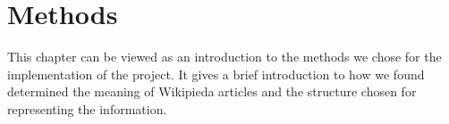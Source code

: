 \chapter{Methods}
This chapter can be viewed as an introduction to the methods we chose for the implementation of the project. It gives a brief introduction to how we found determined the meaning of Wikipieda articles and the structure chosen for representing the information.






